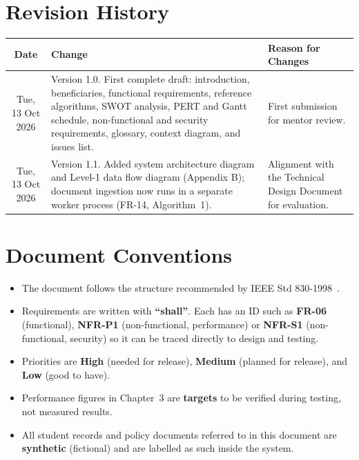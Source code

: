 \documentclass[11pt,a4paper,oneside]{report}
\begin{document}

\setcounter{page}{1}
\tableofcontents
\listoffigures
\listoftables

\chapter*{Revision History}
\begin{tabularx}{\textwidth}{|c|Y|Y|}
\hline
\textbf{Date} & \textbf{Change} & \textbf{Reason for Changes}\\
\hline
Tue, 13 Oct 2026 & Version 1.0. First complete draft: introduction, beneficiaries,
functional requirements, reference algorithms, SWOT analysis, PERT and Gantt schedule,
non-functional and security requirements, glossary, context diagram, and issues list. &
First submission for mentor review.\\
\hline
Tue, 13 Oct 2026 & Version 1.1. Added system architecture diagram and Level-1 data flow
diagram (Appendix B); document ingestion now runs in a separate worker process (FR-14,
Algorithm~1). & Alignment with the Technical Design Document for evaluation.\\
\hline
\end{tabularx}

\chapter*{Document Conventions}
\begin{itemize}
  \item The document follows the structure recommended by IEEE Std
        830-1998~\cite{ieee830}.
  \item Requirements are written with \textbf{``shall''}. Each has an ID such as
        \textbf{FR-06} (functional), \textbf{NFR-P1} (non-functional, performance) or
        \textbf{NFR-S1} (non-functional, security) so it can be traced directly to design
        and testing.
  \item Priorities are \textbf{High} (needed for release), \textbf{Medium} (planned for
        release), and \textbf{Low} (good to have).
  \item Performance figures in Chapter~3 are \textbf{targets} to be verified during testing,
        not measured results.
  \item All student records and policy documents referred to in this document are
        \textbf{synthetic} (fictional) and are labelled as such inside the system.
\end{itemize}
\end{document}
